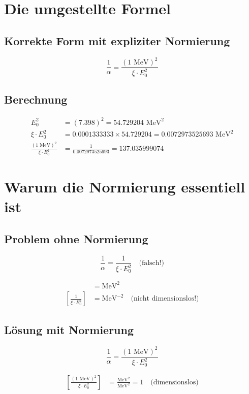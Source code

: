 \documentclass[12pt,a4paper]{article}
\theoremstyle{definition}
\begin{document}
\section*{Die umgestellte Formel}

\subsection*{Korrekte Form mit expliziter Normierung}

\[
\boxed{\frac{1}{\alpha} = \frac{(1 \text{ MeV})^2}{\xi \cdot E_0^2}}
\]

\subsection*{Berechnung}

\begin{align*}
	E_0^2 &= (7.398)^2 = 54.729204 \text{ MeV}^2 \\
	\xi \cdot E_0^2 &= 0.0001333333 \times 54.729204 = 0.0072973525693 \text{ MeV}^2 \\
	\frac{(1 \text{ MeV})^2}{\xi \cdot E_0^2} &= \frac{1}{0.0072973525693} = 137.035999074
\end{align*}

\section*{Warum die Normierung essentiell ist}

\subsection*{Problem ohne Normierung}

\[
\frac{1}{\alpha} = \frac{1}{\xi \cdot E_0^2} \quad \text{(falsch!)}
\]

\begin{align*}
	[\xi \cdot E_0^2] &= \text{MeV}^2 \\
	\left[\frac{1}{\xi \cdot E_0^2}\right] &= \text{MeV}^{-2} \quad \text{(nicht dimensionslos!)}
\end{align*}

\subsection*{Lösung mit Normierung}

\[
\frac{1}{\alpha} = \frac{(1 \text{ MeV})^2}{\xi \cdot E_0^2}
\]

\begin{align*}
	\left[\frac{(1 \text{ MeV})^2}{\xi \cdot E_0^2}\right] &= \frac{\text{MeV}^2}{\text{MeV}^2} = 1 \quad \text{(dimensionslos)}
\end{align*}
\end{document}

